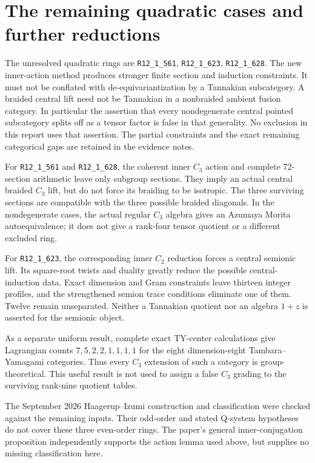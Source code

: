 \documentclass[11pt]{article}
\newcommand{\R}[1]{\texttt{R12\_1\_#1}}
\begin{document}
\section{The remaining quadratic cases and further reductions}
The unresolved quadratic rings are \R{561}, \R{623}, \R{628}.
The new inner-action method produces stronger finite section and
induction constraints. It must not be conflated with de-equivariantization
by a Tannakian subcategory. A braided central lift need not be Tannakian
in a nonbraided ambient fusion category. In particular the assertion
that every nondegenerate central pointed subcategory splits off as a
tensor factor is false in that generality. No exclusion in this report
uses that assertion. The partial constraints and the exact remaining
categorical gaps are retained in the evidence notes.

For \R{561} and \R{628}, the coherent inner $C_3$ action and complete
72-section arithmetic leave only subgroup sections. They imply an actual
central braided $C_3$ lift, but do not force its braiding to be isotropic.
The three surviving sections are compatible with the three possible
braided diagonals. In the nondegenerate cases, the actual regular
$C_3$ algebra gives an Azumaya Morita autoequivalence; it does not give a
rank-four tensor quotient or a different excluded ring.

For \R{623}, the corresponding inner $C_2$ reduction forces a central
semionic lift. Its square-root twists and duality greatly reduce the
possible central-induction data. Exact dimension and Gram constraints
leave thirteen integer profiles, and the strengthened semion trace
conditions eliminate one of them. Twelve remain unseparated. Neither a
Tannakian quotient nor an algebra $1+z$ is asserted for the semionic object.

As a separate uniform result, complete exact TY-center calculations give
Lagrangian counts $7,5,2,2,1,1,1,1$ for the eight dimension-eight
Tambara--Yamagami categories. Thus every $C_3$ extension of such a category
is group-theoretical. This useful result is not used to assign a false
$C_3$ grading to the surviving rank-nine quotient tables.

The September 2026 Haagerup--Izumi construction and classification were
checked against the remaining inputs. Their odd-order and stated
Q-system hypotheses do not cover these three even-order rings. The
paper's general inner-conjugation proposition independently supports the
action lemma used above, but supplies no missing classification here.
\end{document}
